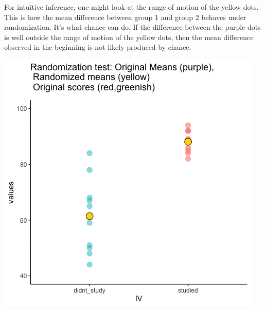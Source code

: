 \documentclass[
]{book}
\begin{document}
For intuitive inference, one might look at the range of motion of the yellow dots. This is how the mean difference between group 1 and group 2 behaves under randomization. It's what chance can do. If the difference between the purple dots is well outside the range of motion of the yellow dots, then the mean difference observed in the beginning is not likely produced by chance.

\includegraphics{gifs/randomizationTest-1.gif}
\end{document}
